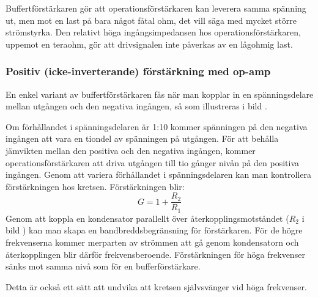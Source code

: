 Buffertförstärkaren gör att operationsförstärkaren kan leverera samma spänning
ut, men mot en last på bara något fåtal ohm, det vill säga med mycket större
strömstyrka.
Den relativt höga ingångsimpedansen hos operationsförstärkaren, uppemot en
teraohm, gör att drivsignalen inte påverkas av en lågohmig last.

\subsubsection{Positiv (icke-inverterande) förstärkning med op-amp}
\label{icke-inverterande foerstaerkning}

En enkel variant av buffertförstärkaren fås när man kopplar in en
spänningsdelare mellan utgången och den negativa ingången, så som illustreras i
bild .


Om förhållandet i spänningsdelaren är 1:10 kommer spänningen på den negativa
ingången att vara en tiondel av spänningen på utgången.
För att behålla jämvikten mellan den positiva och den negativa ingången, kommer
operationsförstärkaren att driva utgången till tio gånger nivån på den positiva
ingången.
Genom att variera förhållandet i spänningsdelaren kan man kontrollera
förstärkningen hos kretsen.
Förstärkningen blir:
\[G = 1+ \dfrac{R_2}{R_1}\]
Genom att koppla en kondensator parallellt över återkopplingsmotståndet
(\(R_2\) i bild ) kan man skapa en bandbreddsbegränsning
för förstärkaren.
För de högre frekvenserna kommer merparten av strömmen att gå genom
kondensatorn och återkopplingen blir därför frekvensberoende.
Förstärkningen för höga frekvenser sänks mot samma nivå som för en
bufferförstärkare.

Detta är också ett sätt att undvika att kretsen självsvänger vid höga
frekvenser.

